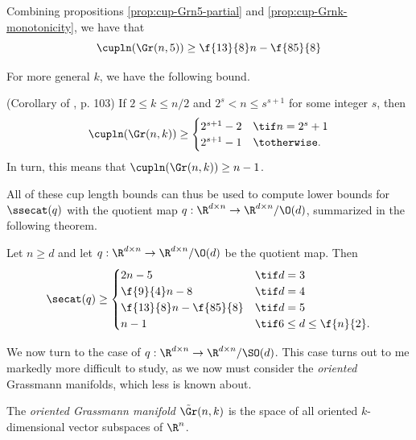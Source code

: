 \begin{corollary}
    Combining propositions \ref{prop:cup-Grn5-partial} and \ref{prop:cup-Grnk-monotonicity}, we have that
    \[
        \cupln(\Gr(n,5)) \geq \f{13}{8} n - \f{85}{8}
    \]
\end{corollary}

For more general $k$, we have the following bound.

\begin{proposition}\label{prop:cup-Grnk-bound}
    (Corollary of \cite{stong1982}, p. 103)
    If $2 \leq k \leq n/2$ and $2^s < n \leq s^{s+1}$ for some integer $s$, then
    \[
        \cupln(\Gr(n,k))
        \geq \begin{cases}
            2^{s+1} - 2 &\tif n = 2^s+1 \\
            2^{s+1} - 1 &\totherwise.
        \end{cases}
    \]
    In turn, this means that $\cupln(\Gr(n,k)) \geq n-1$.
\end{proposition}

All of these cup length bounds can thus be used to compute lower bounds for $\ssecat(q)$ with the quotient map $q :\R^{d \times n} \to \R^{d \times n}/\O(d)$, summarized in the following theorem.

\begin{theorem}\label{ref:Od-secat-lower-bounds}
    Let $n \geq d$ and let $q : \R^{d \times n} \to \R^{d \times n}/\O(d)$ be the quotient map.
    Then
    \[
        \secat(q)
        \geq \begin{cases}
            2n - 5 &\tif d = 3 \\
            \f{9}{4}n - 8 &\tif d = 4 \\
            \f{13}{8}n - \f{85}{8} &\tif d = 5 \\
            n - 1 &\tif 6 \leq d \leq \f{n}{2}.
        \end{cases}
    \]
\end{theorem}


We now turn to the case of $q : \R^{d \times n} \to \R^{d \times n}/\SO(d)$.
This case turns out to me markedly more difficult to study, as we now must consider the \emph{oriented} Grassmann manifolds, which less is known about.

\begin{definition}
    The \emph{oriented Grassmann manifold} $\Tilde{\Gr}(n,k)$ is the space of all oriented $k$-dimensional vector subspaces of $\R^n$.
\end{definition}

